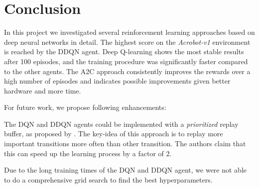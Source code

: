 \documentclass[11pt,a4paper]{article}
\begin{document}
\section{Conclusion}
\label{sec:con}

In this project we investigated several reinforcement learning approaches based on deep neural networks in detail. The highest score on the \textit{Acrobot-v1} environment is reached by the DDQN agent. Deep Q-learning shows the most stable results after 100 episodes, and the training procedure was significantly faster compared to the other agents. The A2C approach consistently improves the rewards over a high number of episodes and indicates possible improvements given better hardware and more time.

For future work, we propose following enhancements: 
\begin{enumerate*}
  \item The DQN and DDQN agents could be implemented with a \textit{prioritized} replay buffer, as proposed by \cite{schaul2015prioritized}. The key-idea of this approach is to replay more important transitions more often than other transition. The authors claim that this can speed up the learning process by a factor of $2$.
  \item Due to the long training times of the DQN and DDQN agent, we were not able to do a comprehensive grid search to find the best hyperparameters.
\end{enumerate*}

\printbibliography
\end{document}

